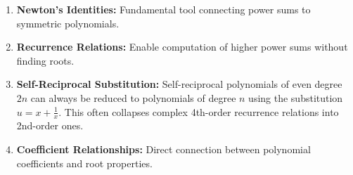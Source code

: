 \begin{takeaways}
\begin{enumerate}
    \item \textbf{Newton's Identities:} Fundamental tool connecting power sums to symmetric polynomials.
    \item \textbf{Recurrence Relations:} Enable computation of higher power sums without finding roots.
    \item \textbf{Self-Reciprocal Substitution:} Self-reciprocal polynomials of even degree $2n$ can always be reduced to polynomials of degree $n$ using the substitution $u = x + \frac{1}{x}$. This often collapses complex 4th-order recurrence relations into 2nd-order ones.
    \item \textbf{Coefficient Relationships:} Direct connection between polynomial coefficients and root properties.
\end{enumerate}
\end{takeaways}

